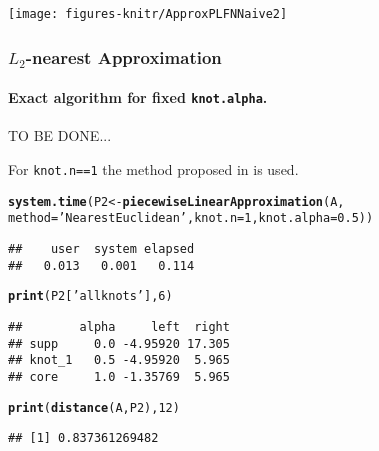 \documentclass[11pt]{article}\usepackage{graphicx, color}
\makeatletter
\newcommand{\hlfunctioncall}[1]{\textcolor[rgb]{0.501960784313725,0,0.329411764705882}{\textbf{#1}}}%
\newcommand{\hlstring}[1]{\textcolor[rgb]{0.6,0.6,1}{#1}}%
\newenvironment{kframe}{%
 \def\at@end@of@kframe{}%
 \ifinner\ifhmode%
  \def\at@end@of@kframe{\end{minipage}}%
  \begin{minipage}{\columnwidth}%
 \fi\fi%
 \def\FrameCommand##1{\hskip\@totalleftmargin \hskip-\fboxsep
 \colorbox{shadecolor}{##1}\hskip-\fboxsep
     \hskip-\linewidth \hskip-\@totalleftmargin \hskip\columnwidth}%
 \MakeFramed {\advance\hsize-\width
   \@totalleftmargin\z@ \linewidth\hsize
   \@setminipage}}%
 {\par\unskip\endMakeFramed%
 \at@end@of@kframe}
\newenvironment{knitrout}{}{} %
\makeatother
\begin{document}
\begin{center}
\begin{knitrout}\small
{}\color{fgcolor}

{\centering \texttt{[image: figures-knitr/ApproxPLFNNaive2]} 

}



\end{knitrout}

\end{center}


\subsubsection{$L_2$-nearest Approximation}

\paragraph{Exact algorithm for fixed \texttt{knot.alpha}.}

TO BE DONE...

For \texttt{knot.n==1} the method proposed in \cite{CoroianuETAL2012:plfnapprox}
is used.

\begin{knitrout}\small
{}\color{fgcolor}\begin{kframe}
\begin{alltt}
\hlfunctioncall{system.time}(P2 <- \hlfunctioncall{piecewiseLinearApproximation}(A,
   method=\hlstring{'NearestEuclidean'}, knot.n=1, knot.alpha=0.5))
\end{alltt}
\begin{verbatim}
##    user  system elapsed 
##   0.013   0.001   0.114
\end{verbatim}
\begin{alltt}
\hlfunctioncall{print}(P2[\hlstring{'allknots'}], 6)
\end{alltt}
\begin{verbatim}
##        alpha     left  right
## supp     0.0 -4.95920 17.305
## knot_1   0.5 -4.95920  5.965
## core     1.0 -1.35769  5.965
\end{verbatim}
\begin{alltt}
\hlfunctioncall{print}(\hlfunctioncall{distance}(A, P2), 12)
\end{alltt}
\begin{verbatim}
## [1] 0.837361269482
\end{verbatim}
\end{kframe}
\end{knitrout}
\end{document}
